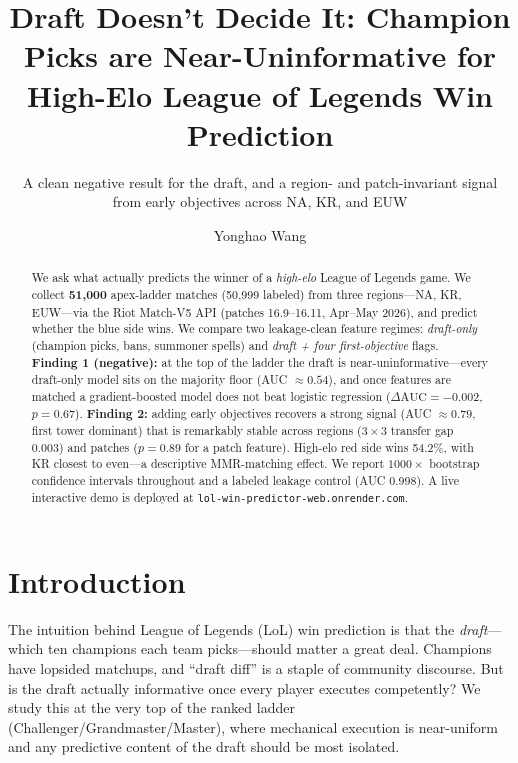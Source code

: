 \documentclass[sigconf,nonacm]{acmart}
\begin{document}
\title{Draft Doesn't Decide It: Champion Picks are Near-Uninformative for
High-Elo League of Legends Win Prediction}
\subtitle{A clean negative result for the draft, and a region- and
patch-invariant signal from early objectives across NA, KR, and EUW}

\author{Yonghao Wang}

\begin{abstract}
We ask what actually predicts the winner of a \emph{high-elo} League of Legends
game. We collect \textbf{51,000} apex-ladder matches (50,999 labeled) from three
regions---NA, KR, EUW---via the Riot Match-V5 API (patches 16.9--16.11, Apr--May
2026), and predict whether the blue side wins. We compare two leakage-clean
feature regimes: \emph{draft-only} (champion picks, bans, summoner spells) and
\emph{draft + four first-objective} flags. \textbf{Finding 1 (negative):} at the
top of the ladder the draft is near-uninformative---every draft-only model sits
on the majority floor (AUC $\approx 0.54$), and once features are matched a
gradient-boosted model does not beat logistic regression
($\Delta\text{AUC} = -0.002$, $p = 0.67$). \textbf{Finding 2:} adding early
objectives recovers a strong signal (AUC $\approx 0.79$, first tower dominant)
that is remarkably stable across regions ($3\times3$ transfer gap 0.003) and
patches ($p = 0.89$ for a patch feature). High-elo red side wins 54.2\%, with KR
closest to even---a descriptive MMR-matching effect. We report $1000\times$
bootstrap confidence intervals throughout and a labeled leakage control (AUC
0.998). A live interactive demo is deployed at
\texttt{lol-win-predictor-web.onrender.com}.
\end{abstract}


\maketitle

\section{Introduction}
The intuition behind League of Legends (LoL) win prediction is that the
\emph{draft}---which ten champions each team picks---should matter a great deal.
Champions have lopsided matchups, and ``draft diff'' is a staple of community
discourse. But is the draft actually informative once every player executes
competently? We study this at the very top of the ranked ladder
(Challenger/Grandmaster/Master), where mechanical execution is near-uniform and
any predictive content of the draft should be most isolated.
\end{document}
